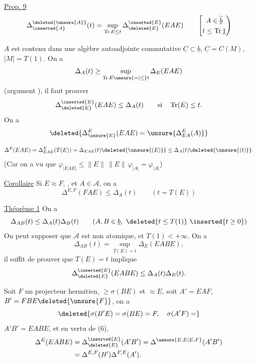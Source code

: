 \uline{Prop. 9}\quad{}
\[
\Delta_{\inserted{A}}^{\deleted{\unsure{A}}}(t)
=\sup_{\operatorname{Tr}E\leq t}\Delta_{\deleted{E}}^{\inserted{E}}(EAE)
\qquad\left[\begin{gathered}A\in\widetilde{\underline b}\\t\leq\operatorname{Tr}\underline1\end{gathered}\right)
\]

$A$ est contenu dans une algèbre autoadjointe commutative  $\underline C\subset\underline b$, $\underline C=C(M)$, $|M|=T(1)$. On a
\[
\Delta_A(t)\geq\sup_{\operatorname{Tr}E\unsure{=|\leq}t}\Delta_E(EAE)
\]
(argument ), il faut prouver
\[
\Delta_{\deleted{E}}^{\inserted{E}}(EAE)\leq\Delta_A(t)
\qquad\text{si}\quad \operatorname{Tr}(E)\leq t.
\]
On a
\[
\deleted{\Delta_{\unsure{E}}^E(EAE)=\unsure{\Delta_{EA}^E(A)}}
\]

\[
\Delta^E(EAE)=\Delta_{EAE}^E(T(E))
=\Delta_{EAE}(t)\deleted{\unsure{(E)}}\leq\Delta_A(t)\deleted{\unsure{(t)}}.
\]
(Car on a vu que $\varphi_{|EAE|}\leq\|E\|\,\|E\|\,\varphi_{|A|}=\varphi_{|A|}$)

\uline{Corollaire} Si $E\approx F$, , et $A\in\mathcal A$, on a
\[
\Delta^{E,F}(FAE)\leq\Delta_A(t)\qquad(t=T(E))
\]

\uline{Théorème 1} On a
\[
\Delta_{AB}(t)\leq\Delta_A(t)\Delta_B(t)
\qquad(A,B\in\underline b,\ \deleted{t\leq T(1)}\ \inserted{t\geq0})
\]
On peut supposer que $\mathcal A$ est non atomique, et $T(1)<+\infty$. On a
\[
\Delta_{AB}(t)=\sup_{T(E)=t}\Delta_E(EABE),
\]
il suffit de prouver que $T(E)=t$ implique
\[
\Delta_{\deleted{E}}^{\inserted{E}}(EABE)\leq\Delta_A(t)\Delta_B(t).
\]

Soit $F$ un projecteur hermitien, $\geq\sigma(BE)$ et $\approx E$, soit $A'=EAF$, $B'=FBE\deleted{\unsure{F}}$, on a
\[
\deleted{\sigma(B'E)=\sigma(BE)=F,\quad\sigma(A'F)=}
\]
$A'B'=EABE$, et en vertu de (6),
\[
\begin{aligned}
\Delta^E(EABE)&=\Delta_{\deleted{E}}^{\inserted{E}}(A'B')
=\Delta^{\unsure{E,E|E,F}}(A'B')\\
&=\Delta^{E,F}(B')\Delta^{F,E}(A').
\end{aligned}
\]

